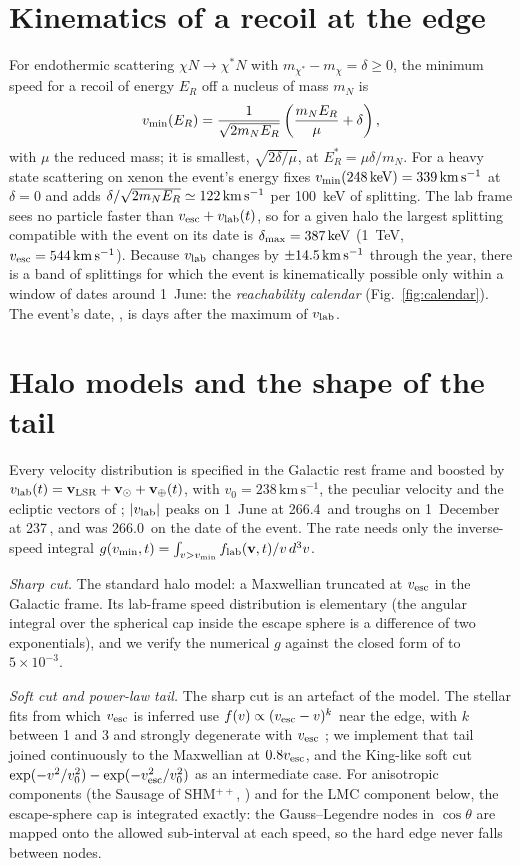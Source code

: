 \documentclass[11pt]{article}
\newcommand{\vmin}{v_{\rm min}\xspace}
\newcommand{\vesc}{v_{\rm esc}\xspace}
\newcommand{\vlab}{v_{\rm lab}\xspace}
\newcommand{\keV}{\,\mathrm{keV}\xspace}
\newcommand{\kms}{\,\mathrm{km\,s^{-1}}\xspace}
\begin{document}
\section{Kinematics of a recoil at the edge}
For endothermic scattering $\chi N\to\chi^\ast N$ with $m_{\chi^\ast}-m_\chi=\delta\ge0$,
the minimum speed for a recoil of energy $E_R$ off a nucleus of mass $m_N$ is
\begin{equation}
  \vmin(E_R)=\frac{1}{\sqrt{2m_NE_R}}\left(\frac{m_NE_R}{\mu}+\delta\right),
\end{equation}
with $\mu$ the reduced mass; it is smallest, $\sqrt{2\delta/\mu}$, at
$E_R^\ast=\mu\delta/m_N$.  For a heavy state scattering on xenon the event's
energy fixes $\vmin(\EventEnergy\keV)=\VminElastic\kms$ at $\delta=0$ and adds
$\delta/\sqrt{2m_NE_R}\simeq\VminPerHundredKeV\kms$ per \SI{100}{keV} of splitting.
The lab frame sees no particle faster than $\vesc+\vlab(t)$, so for a given halo the
largest splitting compatible with the event on its date is
$\delta_{\max}=\DeltaMaxLZ\keV$ (\SI{1}{TeV}, $\vesc=\VescLZ\kms$).  Because $\vlab$
changes by $\pm\VlabAmp\kms$ through the year, there is a band of splittings for
which the event is kinematically possible only within a window of dates around
1~June: the \emph{reachability calendar} (Fig.~\ref{fig:calendar}).  The event's
date, \EventDate, is \DaysAfterPeak days after the maximum of $\vlab$.

\section{Halo models and the shape of the tail}
Every velocity distribution is specified in the Galactic rest frame and boosted by
$\vlab(t)=\mathbf v_{\rm LSR}+\mathbf v_\odot+\mathbf v_\oplus(t)$, with
$v_0=238\kms$, the \citet{Schoenrich2010} peculiar velocity and the ecliptic vectors of
\citet{McCabe2014earth}; $|\vlab|$ peaks on 1~June at 266.4\kms and troughs on
1~December at 237\kms, and was 266.0\kms on the date of the event.  The rate needs
only the inverse-speed integral $g(\vmin,t)=\int_{v>\vmin}f_{\rm lab}(\mathbf v,t)/v\,d^3v$.

\emph{Sharp cut.}  The standard halo model: a Maxwellian truncated at $\vesc$ in the
Galactic frame.  Its lab-frame speed distribution is elementary (the angular integral
over the spherical cap inside the escape sphere is a difference of two exponentials),
and we verify the numerical $g$ against the closed form of \citet{Savage2006} to
$5\times10^{-3}$.

\emph{Soft cut and power-law tail.}  The sharp cut is an artefact of the model.  The
stellar fits from which $\vesc$ is inferred use $f(v)\propto(\vesc-v)^k$ near the edge,
with $k$ between 1 and 3 and strongly degenerate with $\vesc$
\citep{Deason2019vesc,Koppelmanvesc}; we implement that tail joined
continuously to the Maxwellian at $0.8\vesc$, and the King-like soft cut
$\exp(-v^2/v_0^2)-\exp(-\vesc^2/v_0^2)$ as an intermediate case.  For anisotropic
components (the Sausage of SHM$^{++}$, \citealt{Evans2019shmpp}) and for the
LMC component below, the escape-sphere cap is integrated exactly: the
Gauss--Legendre nodes in $\cos\theta$ are mapped onto the allowed sub-interval at
each speed, so the hard edge never falls between nodes.
\end{document}
